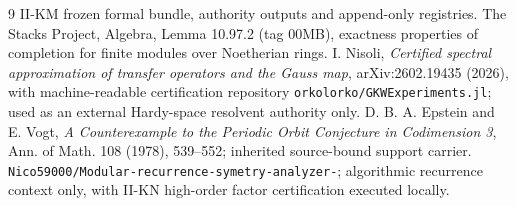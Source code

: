 \documentclass[9.5pt,a4paper]{article}
\begin{document}
\begin{thebibliography}{9}\small
{} II-KM frozen formal bundle, authority outputs and append-only registries.
 The Stacks Project, Algebra, Lemma 10.97.2 (tag 00MB), exactness properties of completion for finite modules over Noetherian rings.
 I. Nisoli, \emph{Certified spectral approximation of transfer operators and the Gauss map}, arXiv:2602.19435 (2026), with machine-readable certification repository \texttt{orkolorko/GKWExperiments.jl}; used as an external Hardy-space resolvent authority only.
 D. B. A. Epstein and E. Vogt, \emph{A Counterexample to the Periodic Orbit Conjecture in Codimension 3}, Ann. of Math. 108 (1978), 539--552; inherited source-bound support carrier.
 \texttt{Nico59000/Modular-recurrence-symetry-analyzer-}; algorithmic recurrence context only, with II-KN high-order factor certification executed locally.
\end{thebibliography}
\end{document}
